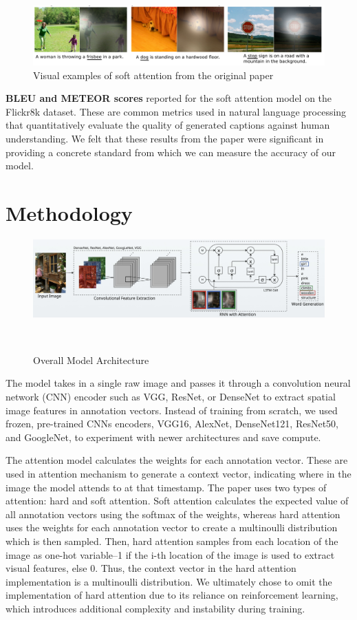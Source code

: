 \documentclass{article}
\begin{document}
\begin{figure}[h]
    \centering
    \includegraphics[width=0.9\linewidth]{chosen-results.png}
    \caption{Visual examples of soft attention from the original paper}
    \label{fig:enter-label}
\end{figure}

\textbf{BLEU and METEOR scores} reported for the soft attention model on the Flickr8k dataset. These are common metrics used in natural language processing that quantitatively evaluate the quality of generated captions against human understanding. We felt that these results from the paper were significant in providing a concrete standard from which we can measure the accuracy of our model.


\section{Methodology}
\begin{figure}[h]
    \centering
    \includegraphics[scale=0.2]{methodology.png}
    \caption{Overall Model Architecture}
    \
\end{figure}
The model takes in a single raw image and passes it through a convolution neural network (CNN) encoder such as VGG, ResNet, or DenseNet to extract spatial image features in annotation vectors. Instead of training from scratch, we used frozen, pre-trained CNNs encoders, VGG16, AlexNet, DenseNet121, ResNet50, and GoogleNet, to experiment with newer architectures and save compute. 

The attention model calculates the weights for each annotation vector. These are used in attention mechanism to generate a context vector, indicating where in the image the model attends to at that timestamp. The paper uses two types of attention: hard and soft attention. Soft attention calculates the expected value of all annotation vectors using the softmax of the weights, whereas hard attention uses the weights for each annotation vector to create a multinoulli distribution which is then sampled. Then, hard attention samples from each location of the image as one-hot variable--1 if the i-th location of the image is used to extract visual features, else 0. Thus, the context vector in the hard attention implementation is a multinoulli distribution. We ultimately chose to omit the implementation of hard attention due to its reliance on reinforcement learning, which introduces additional complexity and instability during training. 
\end{document}
